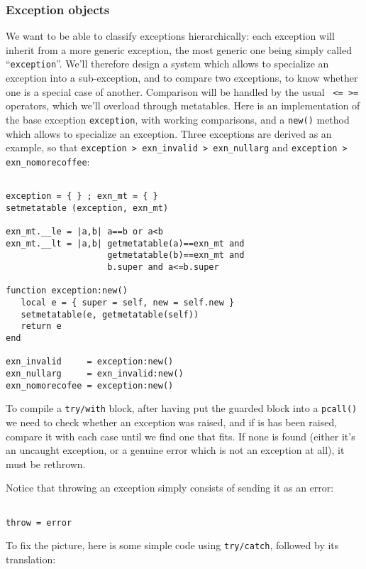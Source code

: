 \subsubsection{Exception objects}
We want to be able to classify exceptions hierarchically: each
exception will inherit from a more generic exception, the most generic
one being simply called ``{\tt exception}''. We'll therefore design a
system which allows to specialize an exception into a sub-exception,
and to compare two exceptions, to know whether one is a special case
of another. Comparison will be handled by the usual {\tt< > <= >=}
operators, which we'll overload through metatables. Here is an
implementation of the base exception {\tt exception}, with working
comparisons, and a {\tt new()} method which allows to specialize an
exception. Three exceptions are derived as an example, so that
{\tt exception > exn\_invalid > exn\_nullarg} and {\tt exception >
  exn\_nomorecoffee}:

\begin{Verbatim}[fontsize=\scriptsize]

exception = { } ; exn_mt = { } 
setmetatable (exception, exn_mt)

exn_mt.__le = |a,b| a==b or a<b 
exn_mt.__lt = |a,b| getmetatable(a)==exn_mt and 
                    getmetatable(b)==exn_mt and
                    b.super and a<=b.super

function exception:new()
   local e = { super = self, new = self.new }
   setmetatable(e, getmetatable(self))
   return e
end

exn_invalid     = exception:new()
exn_nullarg     = exn_invalid:new()
exn_nomorecofee = exception:new()
\end{Verbatim}

To compile a {\tt try/with} block, after having put the guarded block
into a {\tt pcall()} we need to check whether an exception was raised,
and if is has been raised, compare it with each case until we find one
that fits. If none is found (either it's an uncaught exception, or a
genuine error which is not an exception at all), it must be rethrown. 

Notice that throwing an exception simply consists of sending it as
an error:
\begin{Verbatim}[fontsize=\scriptsize]

throw = error
\end{Verbatim}

To fix the picture, here is some simple code using {\tt try/catch},
followed by its translation:


